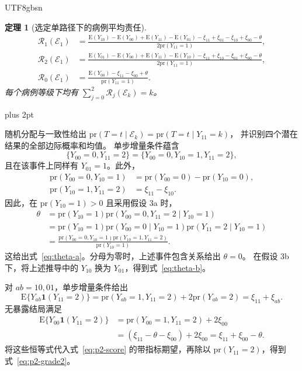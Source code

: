 \documentclass[11pt,a4paper]{article}
\makeatletter
\newcommand{\headingweight}{\ifPDFTeX\mdseries\else\bfseries\fi}
\theoremstyle{report}
\newtheorem{theorem}{定理}
\renewenvironment{proof}[1][证明]{\par\pushQED{\qed}\normalfont
  \topsep=6pt plus 2pt\relax\trivlist
  \item[\hskip\labelsep{\headingweight #1。}]\ignorespaces}
  {\popQED\endtrivlist\@endpefalse}
\newcommand{\pr}{\mathrm{pr}}
\newcommand{\E}{\mathrm E}
\makeatother
\begin{document}
\begin{CJK*}{UTF8}{gbsn}
\begin{theorem}[选定单路径下的病例平均责任]
\begin{equation}
\begin{aligned}
\mathcal R_1(\mathcal E_1)
 &=\frac{\E(Y_{10})-\E(Y_{00})+\E(Y_{11})-\E(Y_{01})
          -\xi_{11}+\xi_{01}-\xi_{10}+\xi_{00}-\theta}
         {2\pr(Y_{11}=1)},\\[3pt]
\mathcal R_2(\mathcal E_1)
 &=\frac{\E(Y_{01})-\E(Y_{00})+\E(Y_{11})-\E(Y_{10})
          -\xi_{11}+\xi_{10}-\xi_{01}+\xi_{00}-\theta}
         {2\pr(Y_{11}=1)},\\[3pt]
\mathcal R_0(\mathcal E_1)
 &=\frac{\E(Y_{00})-\xi_{11}-\xi_{00}+\theta}{\pr(Y_{11}=1)}.
\end{aligned}
\end{equation}
每个病例等级下均有 $\sum_{j=0}^{2}\mathcal R_j(\mathcal E_k)=k$。
\end{theorem}

\begin{proof}
随机分配与一致性给出
$\pr(T=t\mid\mathcal E_k)=\pr(T=t\mid Y_{11}=k)$，
并识别四个潜在结果的全部边际概率和均值。
单步增量条件蕴含
\[
\{Y_{00}=0,Y_{11}=2\}
=\{Y_{00}=0,Y_{10}=1,Y_{11}=2\},
\]
且在该事件上同样有 $Y_{01}=1$。此外，
\[
\begin{aligned}
\pr(Y_{00}=0,Y_{10}=1)&=\pr(Y_{00}=0)-\pr(Y_{10}=0),\\
\pr(Y_{10}=1,Y_{11}=2)&=\xi_{11}-\xi_{10}.
\end{aligned}
\]
因此，在 $\pr(Y_{10}=1)>0$ 且采用假设 3a 时，
\[
\begin{aligned}
\theta
&=\pr(Y_{10}=1)\pr(Y_{00}=0,Y_{11}=2\mid Y_{10}=1)\\
&=\pr(Y_{10}=1)\pr(Y_{00}=0\mid Y_{10}=1)
                       \pr(Y_{11}=2\mid Y_{10}=1)\\
&=\frac{\pr(Y_{00}=0,Y_{10}=1)\pr(Y_{10}=1,Y_{11}=2)}
        {\pr(Y_{10}=1)}.
\end{aligned}
\]
这给出式~\eqref{eq:theta-a}。分母为零时，上述事件包含关系给出 $\theta=0$。
在假设 3b 下，将上述推导中的 $Y_{10}$ 换为 $Y_{01}$，得到式~\eqref{eq:theta-b}。

对 $ab=10,01$，单步增量条件给出
\[
\E\{Y_{ab}\mathbf1(Y_{11}=2)\}
=\pr(Y_{ab}=1,Y_{11}=2)+2\pr(Y_{ab}=2)
=\xi_{11}+\xi_{ab}.
\]
无暴露结局满足
\[
\begin{aligned}
\E\{Y_{00}\mathbf1(Y_{11}=2)\}
&=\pr(Y_{00}=1,Y_{11}=2)+2\xi_{00}\\
&=(\xi_{11}-\theta-\xi_{00})+2\xi_{00}
=\xi_{11}+\xi_{00}-\theta.
\end{aligned}
\]
将这些恒等式代入式~\eqref{eq:p2-score} 的带指标期望，再除以
$\pr(Y_{11}=2)$，得到式~\eqref{eq:p2-grade2}。


\end{proof}
\end{CJK*}
\end{document}
